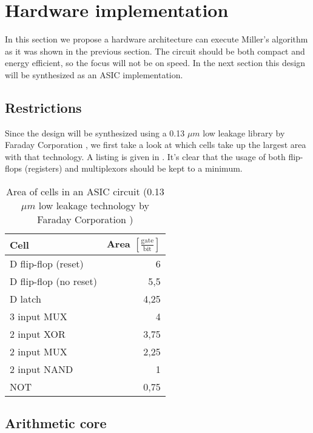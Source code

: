 \section{Hardware implementation\label{section-hardware}}

In this section we propose a hardware architecture can execute Miller's algorithm as it was shown in the previous section. The circuit should be both compact and energy efficient, so the focus will not be on speed. In the next section this design will be synthesized as an ASIC implementation.

\subsection{Restrictions}

Since the design will be synthesized using a 0.13 $\mu m$ low leakage library by Faraday Corporation \cite{cell-databook}, we first take a look at which cells take up the largest area with that technology. A listing is given in . It's clear that the usage of both flip-flops (registers) and multiplexors should be kept to a minimum.

\begin{table}[h]
	\caption[Area of cells in an ASIC circuit]{Area of cells in an ASIC circuit (0.13 $\mu m$ low leakage technology by Faraday Corporation \cite{cell-databook})}
	\label{table-cells}

	\centering
	\begin{tabular}{lr}
		\toprule
		Cell							& Area $\left[\frac{\text{gate}}{\text{bit}}\right]$\\
		\midrule
		D flip-flop (reset)		& 6\\
		D flip-flop (no reset)	& 5,5\\
		D latch						& 4,25\\
		3 input MUX					& 4\\
		2 input XOR					& 3,75\\
		2 input MUX					& 2,25\\
		2 input NAND				& 1\\
		NOT							& 0,75\\
		\bottomrule
	\end{tabular}
\end{table}

\subsection{Arithmetic core}

